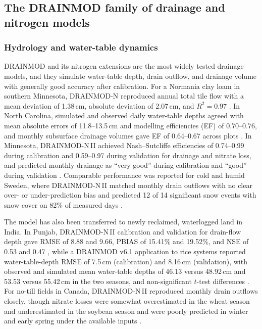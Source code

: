 \subsection{The DRAINMOD family of drainage and nitrogen models}

\subsubsection{Hydrology and water-table dynamics}

DRAINMOD and its nitrogen extensions are the most widely tested drainage models, and they simulate water-table depth, drain outflow, and drainage volume with generally good accuracy after calibration. For a Normania clay loam in southern Minnesota, DRAINMOD-N reproduced annual total tile flow with a mean deviation of 1.38\,cm, absolute deviation of 2.07\,cm, and $R^2 = 0.97$ \parencite{Zhao2000}. In North Carolina, simulated and observed daily water-table depths agreed with mean absolute errors of 11.8--13.5\,cm and modelling efficiencies (EF) of 0.70--0.76, and monthly subsurface drainage volumes gave EF of 0.64--0.67 across plots \parencite{Youssef2006}. In Minnesota, DRAINMOD-N\,II achieved Nash--Sutcliffe efficiencies of 0.74--0.99 during calibration and 0.59--0.97 during validation for drainage and nitrate loss, and predicted monthly drainage as ``very good'' during calibration and ``good'' during validation \parencite{Luo2010,Ale2013}. Comparable performance was reported for cold and humid Sweden, where DRAINMOD-N\,II matched monthly drain outflows with no clear over- or under-prediction bias and predicted 12 of 14 significant snow events with snow cover on 82\% of measured days \parencite{Salazar2009}.

The model has also been transferred to newly reclaimed, waterlogged land in India. In Punjab, DRAINMOD-N\,II calibration and validation for drain-flow depth gave RMSE of 8.88 and 9.66, PBIAS of 15.41\% and 19.52\%, and NSE of 0.53 and 0.47 \parencite{Dar2022}, while a DRAINMOD v6.1 application to rice systems reported water-table-depth RMSE of 7.5\,cm (calibration) and 8.16\,cm (validation), with observed and simulated mean water-table depths of 46.13 versus 48.92\,cm and 53.53 versus 55.42\,cm in the two seasons, and non-significant $t$-test differences \parencite{Dar2025}. For no-till fields in Canada, DRAINMOD-N\,II reproduced monthly drain outflows closely, though nitrate losses were somewhat overestimated in the wheat season and underestimated in the soybean season and were poorly predicted in winter and early spring under the available inputs \parencite{Garmdareh2018}.

